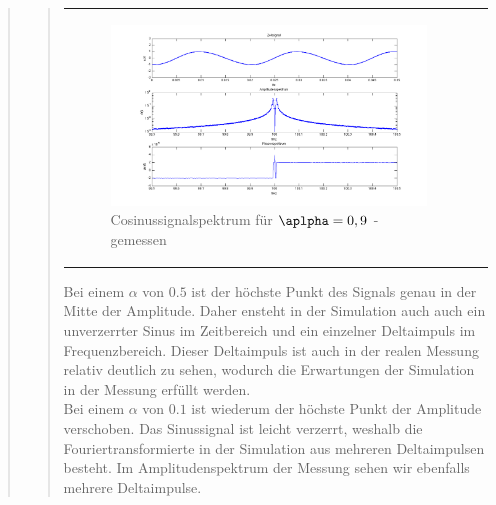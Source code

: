 \begin{quote}
\begin{quote}
\begin{center}
\begin{tabular}{ll}
\begin{minipage}{0.6\textwidth}
                    \begin{figure}[H]
                        \label{fig:}            
                        \includegraphics[scale=0.3]{./Bilder/cos_alpha9_-_gemessen.png} %
                        \caption{Cosinussignalspektrum für $\aplpha = 0,9$ - gemessen}
                    \end{figure}                
                
                \end{minipage}
                        
            \end{tabular}
            \end{center}
            
            Bei einem $\alpha$ von $0.5$ ist der höchste Punkt des Signals genau
            in der Mitte der Amplitude. Daher ensteht in der Simulation auch
            auch ein unverzerrter Sinus im Zeitbereich und ein einzelner
            Deltaimpuls im Frequenzbereich. Dieser Deltaimpuls ist auch in
            der realen Messung relativ deutlich zu sehen, wodurch die
            Erwartungen der Simulation in der Messung erfüllt werden.\\
            
            Bei einem $\alpha$ von $0.1$ ist wiederum der höchste Punkt der Amplitude verschoben. 
            Das Sinussignal ist leicht verzerrt, weshalb die Fouriertransformierte 
            in der Simulation aus mehreren Deltaimpulsen besteht. Im
            Amplitudenspektrum der Messung sehen wir ebenfalls mehrere Deltaimpulse.\\
            

\end{quote}
\end{quote}
